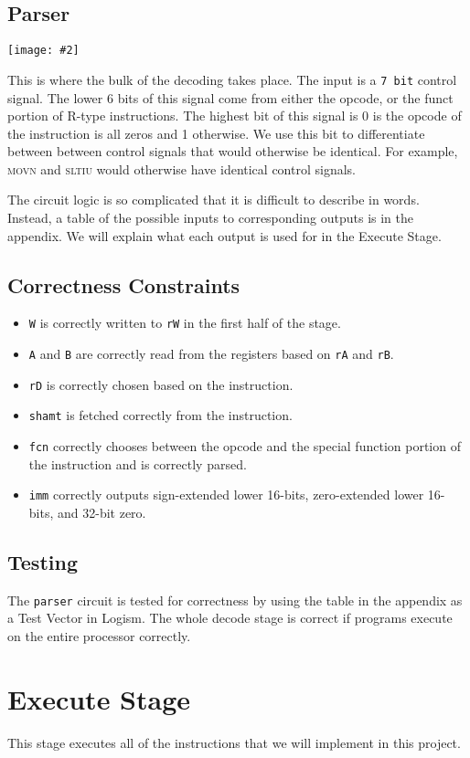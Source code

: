 \documentclass[10pt]{article}
\newcommand{\diagram}[2][1]{\begin{center}\texttt{[image: \#2]}\end{center}}
\begin{document}
\subsection{Parser}
\diagram{parser}
This is where the bulk of the decoding takes place. The input is a \texttt{7 bit} control signal.
The lower 6 bits of this signal come from either the opcode, or the funct portion of R-type instructions.
The highest bit of this signal is 0 is the opcode of the instruction is all zeros and 1 otherwise. 
We use this bit to differentiate between between control signals that would otherwise be identical.
For example, \textsc{movn} and \textsc{sltiu} would otherwise have identical control signals.

The circuit logic is so complicated that it is difficult to describe in words. Instead, a table of the possible inputs to corresponding outputs is in the appendix.
We will explain what each output is used for in the Execute Stage.

\subsection{Correctness Constraints}
\begin{itemize}
\item \texttt{W} is correctly written to \texttt{rW} in the first half of the stage. 
\item \texttt{A} and \texttt{B} are correctly read from the registers based on \texttt{rA} and \texttt{rB}.
\item \texttt{rD} is correctly chosen based on the instruction. 
\item \texttt{shamt} is fetched correctly from the instruction.
\item \texttt{fcn} correctly chooses between the opcode and the special function portion of the instruction and is correctly parsed.
\item \texttt{imm} correctly outputs sign-extended lower 16-bits, zero-extended lower 16-bits, and 32-bit zero.
\end{itemize}
\subsection{Testing}
The \texttt{parser} circuit is tested for correctness by using the table in the appendix as a Test Vector in Logism.
The whole decode stage is correct if programs execute on the entire processor correctly.

\section{Execute Stage}
This stage executes all of the instructions that we will implement in this project. 
\end{document}

